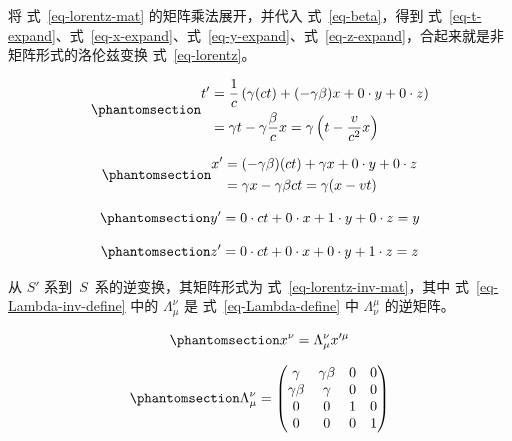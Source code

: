 \documentclass[
  chinese,
  a4paper,
  UTF8,
  12pt,
  oneside,
  openany]{ctexbook}
\theoremstyle{plain}
\theoremstyle{plain}
\theoremstyle{plain}
\theoremstyle{definition}
\theoremstyle{plain}
\theoremstyle{plain}
\theoremstyle{remark}
\begin{document}
将 式~\ref{eq-lorentz-mat} 的矩阵乘法展开，并代入 式~\ref{eq-beta}，得到
式~\ref{eq-t-expand}、式~\ref{eq-x-expand}、式~\ref{eq-y-expand}、式~\ref{eq-z-expand}，合起来就是非矩阵形式的洛伦兹变换
式~\ref{eq-lorentz}。

\begin{equation}\protect\phantomsection\label{eq-t-expand}{
\begin{aligned}
t' &= \frac{1}{c}\left(\gamma(ct) + (-\gamma\beta)x + 0 \cdot y + 0 \cdot z \right) \\
&= \gamma t - \gamma\frac{\beta}{c}x
= \gamma\left(t - \frac{v}{c^{2}}x \right)
\end{aligned}
}\end{equation}

\begin{equation}\protect\phantomsection\label{eq-x-expand}{
\begin{aligned}
x' &= (-\gamma\beta)(ct) + \gamma x + 0 \cdot y + 0 \cdot z \\
&= \gamma x - \gamma\beta ct
= \gamma(x - vt)
\end{aligned}
}\end{equation}

\begin{equation}\protect\phantomsection\label{eq-y-expand}{
y' = 0 \cdot ct + 0 \cdot x + 1 \cdot y + 0 \cdot z = y
}\end{equation}

\begin{equation}\protect\phantomsection\label{eq-z-expand}{
z' = 0 \cdot ct + 0 \cdot x + 0 \cdot y + 1 \cdot z = z
}\end{equation}

从 \(S'\) 系到~\(S\)~系的逆变换，其矩阵形式为
式~\ref{eq-lorentz-inv-mat}，其中 式~\ref{eq-Lambda-inv-define} 中的
\(\Lambda_{\mu}^{\nu}\) 是 式~\ref{eq-Lambda-define} 中
\(\Lambda_{\nu}^{\mu}\) 的逆矩阵。

\begin{equation}\protect\phantomsection\label{eq-lorentz-inv-mat}{
x^{\nu} = \Lambda_{\mu}^{\nu}x'^{\mu}
}\end{equation}

\begin{equation}\protect\phantomsection\label{eq-Lambda-inv-define}{
\Lambda_{\mu}^{\nu} = \begin{pmatrix}
 \gamma & \gamma\beta & 0 & 0 \\
 \gamma\beta & \gamma & 0 & 0 \\
 0 & 0 & 1 & 0 \\
 0 & 0 & 0 & 1
 \end{pmatrix}
}\end{equation}
\end{document}
